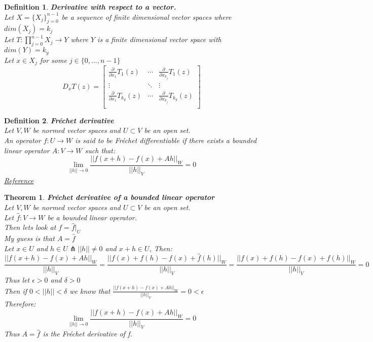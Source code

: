 \documentclass[12pt]{extarticle}
\theoremstyle{plain}
\newtheorem{thm}{Theorem}[section]
\theoremstyle{Definition}
\newtheorem{def.}{Definition}[section]
\theoremstyle{Definition}
\theoremstyle{plain}
\begin{document}
\begin{def.} \textbf{Derivative with respect to a vector.} \\ 
	Let $X = \{X_j\}_{j=0}^{n-1}$ be a sequence of finite dimensional vector spaces where $dim(X_j) = k_j$ \\ 
	Let $T : \prod_{j=0}^{n-1} X_j \to Y$ where $Y$ is a finite dimensional vector space with $dim(Y) = k_y$ \\ 
	Let $x \in X_j$ for some $j \in \{0,...,n-1\}$ \\ 
	\[
	D_x T(z) = 
	\begin{bmatrix}
	\frac{\partial}{\partial x_1} T_1(z) & \cdots & \frac{\partial}{\partial x_{k_j}} T_1(z) \\
	\vdots & \ddots & \vdots \\ 
	\frac{\partial}{\partial x_1} T_{k_y}(z) & \cdots & \frac{\partial}{\partial x_{k_j}} T_{k_y}(z) \\	
	\end{bmatrix}
	\]
	
\end{def.}

\begin{def.} \textbf{Fréchet derivative} \\ 
		Let $V,W$ be normed vector spaces and $U \subset V$ be an open set. \\ 
		An operator $f : U \to W$ is said to be Fréchet differentiable if there exists a bounded linear operator $A : V \to W$ such that: \\ 
		$$\lim_{||h||\to0} \frac{||f(x+h) - f(x) + Ah||_W}{||h||_V} = 0$$
		\href{https://en.wikipedia.org/wiki/Fr%C3%A9chet_derivative}{Reference}
\end{def.} 

\begin{thm} \textbf{Fréchet derivative of a bounded linear operator} \\ 
	Let $V,W$ be normed vector spaces and $U \subset V$ be an open set. \\ 
	Let $\hat{f} : V \to W$ be a bounded linear operator. \\
	Then lets look at $f = \hat{f}|_{U}$ \\ 
	My guess is that $A = \hat{f}$ \\ 
	Let $x \in U$ and $h \in U \pitchfork ||h|| \not = 0$ and $x+h \in U$, Then: \\ 
	$$\frac{||f(x+h) - f(x) + Ah||_W}{||h||_V} = \frac{||f(x)+f(h) - f(x) + \hat{f}(h)||_W}{||h||_V} = \frac{||f(x)+f(h) - f(x) + f(h)||_W}{||h||_V}= 0$$
	Thus let $\epsilon > 0$ and $\delta > 0$ \\ 
	Then if $0 < ||h|| < \delta$ we know that  
	$\frac{||f(x+h) - f(x) + Ah||_W}{||h||_V} = 0 < \epsilon$ \\ 
	Therefore: 
	$$\lim_{||h||\to0} \frac{||f(x+h) - f(x) + Ah||_W}{||h||_V} = 0$$
	Thus $A = \hat{f}$ is the Fréchet derivative  of f. 
\end{thm}
\end{document}
